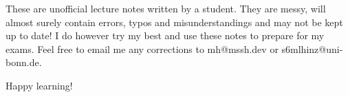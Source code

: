 \begin{tcolorbox}[enhanced,breakable,
	title=Warning,colback=red!20!white]
	These are unofficial lecture notes written by a student. They are messy, will almost surely contain 
    errors, typos and misunderstandings and may not be kept up to date! I do however try my best and use 
    these notes to prepare for my exams. Feel free to email me any corrections to mh@mssh.dev or s6mlhinz@uni-bonn.de.

    Happy learning!
\end{tcolorbox}